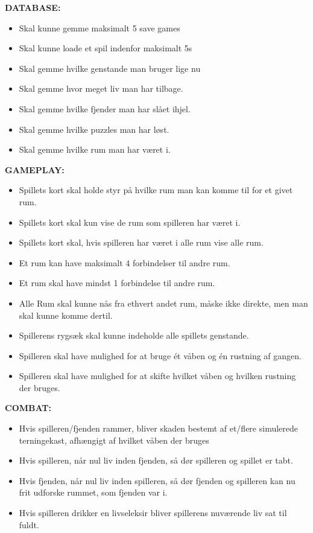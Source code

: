 \textbf{DATABASE:}

\begin{itemize}
  \item Skal kunne gemme maksimalt 5 save games
  \item Skal kunne loade et spil indenfor maksimalt 5s
  \item Skal gemme hvilke genstande man bruger lige nu
  \item Skal gemme hvor meget liv man har tilbage.
  \item Skal gemme hvilke fjender man har slået ihjel.
  \item Skal gemme hvilke puzzles man har løst.
  \item Skal gemme hvilke rum man har været i.
\end{itemize}

\textbf{GAMEPLAY:}
\begin{itemize}
  \item Spillets kort skal holde styr på hvilke rum man kan komme til for et givet rum.
  \item Spillets kort skal kun vise de rum som spilleren har været i.
  \item Spillets kort skal, hvis spilleren har været i alle rum vise alle rum.
  \item Et rum kan have maksimalt 4 forbindelser til andre rum.
  \item Et rum skal have mindst 1 forbindelse til andre rum.
  \item Alle Rum skal kunne nås fra ethvert andet rum, måske ikke direkte, men man skal kunne komme dertil.
  \item Spillerens rygsæk skal kunne indeholde alle spillets genstande.
  \item Spilleren skal have mulighed for at bruge ét våben og én rustning af gangen.
  \item Spilleren skal have mulighed for at skifte hvilket våben og hvilken rustning der bruges.
\end{itemize}
    
\textbf{COMBAT:}

\begin{itemize}
  \item Hvis spilleren/fjenden rammer, bliver skaden bestemt af et/flere simulerede terningekast, afhængigt af hvilket våben der bruges
  \item Hvis spilleren, når nul liv inden fjenden, så dør spilleren og spillet er tabt.
  \item Hvis fjenden, når nul liv inden spilleren, så dør fjenden og spilleren kan nu frit udforske rummet, som fjenden var i.
  \item Hvis spilleren drikker en livseleksir bliver spillerens nuværende liv sat til fuldt.
\end{itemize}

